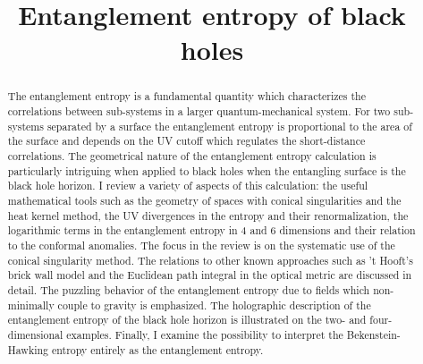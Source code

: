 \documentclass[12pt]{article}
\begin{document}
\title{ Entanglement entropy of black holes}

\author{
{%
}%
}
\date{}
\maketitle

\begin{abstract}
The entanglement entropy is a fundamental quantity which characterizes the correlations between sub-systems in a larger 
quantum-mechanical  system. For two sub-systems separated by a surface the entanglement entropy is proportional to the area of the surface
and depends on the UV cutoff which regulates the short-distance correlations. The geometrical nature of the entanglement entropy calculation is particularly intriguing
when applied to black holes  when the entangling surface is the  black hole horizon. I review a variety of  aspects of this calculation: the useful mathematical tools such as
the geometry of spaces with conical singularities and the heat kernel method, the UV divergences in the entropy and their renormalization, the logarithmic terms  in the entanglement entropy in 4 and 6 dimensions and  
their relation to the conformal anomalies. The focus in the review is  on the systematic use of the conical singularity method. The relations to other known approaches such as 't Hooft's brick wall model and the Euclidean path integral in the optical metric  are discussed in detail. The puzzling behavior of the entanglement entropy due to fields which  non-minimally couple to gravity is emphasized. The holographic description of the entanglement entropy of the black hole horizon is illustrated on the two- and four-dimensional examples.  Finally, I examine the possibility to interpret  the Bekenstein-Hawking entropy entirely as  the entanglement entropy.

\end{abstract}



\newpage
    \tableofcontents
\pagebreak

\newpage
\end{document}
